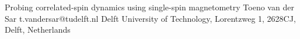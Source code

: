 \begin{conf-abstract}[]
{Probing correlated-spin dynamics using single-spin magnetometry}
{\color{blue} Toeno van der Sar}
{t.vandersar@tudelft.nl}
{Delft University of Technology, Lorentzweg 1, 2628CJ, Delft, Netherlands}
{\decofourleft \decofourright}





\printbibliography[heading=none]

\end{conf-abstract}
